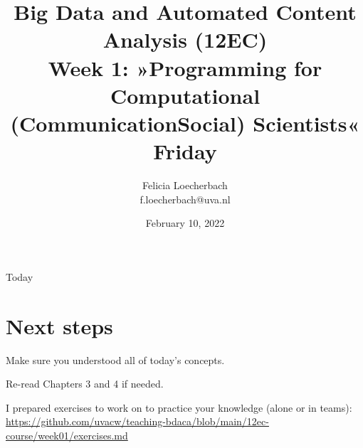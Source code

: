 

\graphicspath{{../../resources/img/}}




\title[Big Data and Automated Content Analysis]{\textbf{Big Data and Automated Content Analysis (12EC)} 
\\Week 1: »Programming for Computational (Communication\textbar Social) Scientists«
\\Friday }
\author[Felicia Loecherbach]{Felicia Loecherbach\\ \footnotesize{f.loecherbach@uva.nl\\}}
\date{February 10, 2022}


\begin{frame}{}
	\titlepage
\end{frame}

\begin{frame}{Today}
	\tableofcontents
\end{frame}










\section{Next steps}




\begin{frame}[standout]
Make sure you understood all of today's concepts.

Re-read Chapters 3 and 4 if needed.

I prepared exercises to work on to practice your knowledge (alone or in teams):
\large{\url{https://github.com/uvacw/teaching-bdaca/blob/main/12ec-course/week01/exercises.md}}
\end{frame}





\begin{frame}
	\printbibliography
\end{frame}



